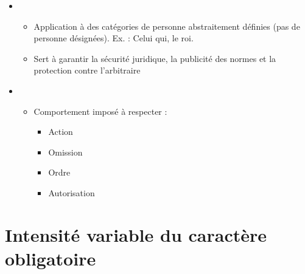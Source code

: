 \begin{itemize}
\item {}
	\begin{itemize}
	\item Application à des catégories de personne abstraitement définies (pas de personne désignées). Ex. : Celui qui, le roi.
	\item Sert à garantir la sécurité juridique, la publicité des normes et la protection contre l'arbitraire
	\end{itemize}
\item {}
	\begin{itemize}
	\item Comportement imposé à respecter :
		\begin{itemize}
		\item Action
		\item Omission
		\item Ordre
		\item Autorisation
		\end{itemize}
	\end{itemize}
\end{itemize}

\section{Intensité variable du caractère obligatoire}

